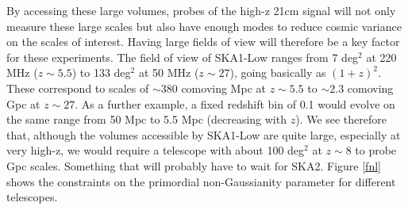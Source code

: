 \documentclass{PoS}
\begin{document}
By accessing these large volumes, probes of the high-z 21cm signal will not only measure these large scales but also have enough modes to reduce cosmic variance on the scales of interest.
Having large fields of view will therefore be a key factor for these experiments. The field of view of SKA1-Low ranges from 7 deg$^2$ at 220 MHz ($z\sim 5.5$) to 133 deg$^2$ at 50 MHz ($z\sim 27$), going basically as $(1+z)^2$. These correspond to scales of $\sim 380$ comoving Mpc at $z\sim 5.5$ to $\sim 2.3$ comoving Gpc at $z\sim 27$. As a further example, a fixed redshift bin of 0.1 would evolve on the same range from 50 Mpc to 5.5 Mpc (decreasing with $z$). We see therefore that, although the volumes accessible by SKA1-Low are quite large, especially at very high-z, we would require a telescope with about 100 deg$^2$ at $z\sim 8$ to probe Gpc scales. Something that will probably have to wait for SKA2. Figure \ref{fnl} shows the constraints on the primordial non-Gaussianity parameter for different telescopes.
\end{document}
